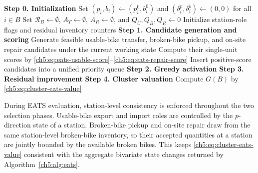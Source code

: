 \begin{algorithm}[htbp]
\caption{EATS evaluation of a cluster}
\label{ch5:alg:eats}
\textbf{Step 0. Initialization}\;
Set $(p_i,b_i)\gets(p_i^0,b_i^0)$ and $(\delta_i^p,\delta_i^b)\gets(0,0)$ for all $i\in B$\;
Set $\mathcal R_B\gets\emptyset$, $A_T\gets\emptyset$, $A_R\gets\emptyset$, and $Q_U,Q_B,Q_R\gets0$\;
Initialize station-role flags and residual inventory counters\;
\textbf{Step 1. Candidate generation and scoring}\;
Generate feasible usable-bike transfer, broken-bike pickup, and on-site repair candidates under the current working state\;
Compute their single-unit scores by \eqref{ch5:eq:eats-usable-score}--\eqref{ch5:eq:eats-repair-score}\;
Insert positive-score candidates into a unified priority queue\;
\textbf{Step 2. Greedy activation}\;
\textbf{Step 3. Residual improvement}\;
\textbf{Step 4. Cluster valuation}\;
Compute $G(B)$ by \eqref{ch5:eq:cluster-eats-value}\;
\;
\end{algorithm}

During EATS evaluation, station-level consistency is enforced throughout the two
selection phases. Usable-bike export and import roles are controlled by the
$p$-direction state of a station. Broken-bike pickup and on-site repair draw
from the same station-level broken-bike inventory, so their accepted quantities
at a station are jointly bounded by the available broken bikes. This keeps
\eqref{ch5:eq:cluster-eats-value} consistent with the aggregate bivariate state
changes returned by Algorithm~\ref{ch5:alg:eats}.


